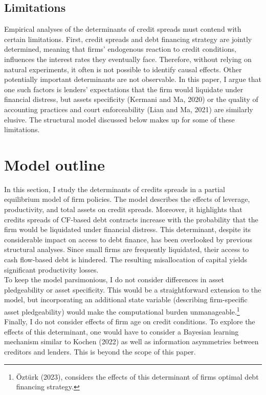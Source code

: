 \documentclass[12pt]{article}
\begin{document}
\subsection{Limitations}
Empirical analyses of the determinants of credit spreads must contend with certain limitations. First, credit spreads and debt financing strategy are jointly determined, meaning that firms' endogenous reaction to credit conditions, influences the interest rates they eventually face. Therefore, without relying on natural experiments, it often is not possible to identify causal effects. Other potentially important determinants are not observable. In this paper, I argue that one such factors is lenders' expectations that the firm would liquidate under financial distress, but assets specificity (Kermani and Ma, 2020) or the quality of accounting practices and court enforceability (Lian and Ma, 2021) are similarly elusive. The structural model discussed below makes up for some of these limitations. 

\section{Model outline} \label{sec:model}

In this section, I study the determinants of credits spreads in a partial equilibrium model of firm policies. The model describes the effects of leverage, productivity, and total assets on credit spreads. Moreover, it highlights that credits spreads of CF-based debt contracts increase with the probability that the firm would be liquidated under financial distress. This determinant, despite its considerable impact on access to debt finance, has been overlooked by previous structural analyses. Since small firms are frequently liquidated, their access to cash flow-based debt is hindered. The resulting misallocation of capital yields significant productivity losses. \vspace{3mm} \\
To keep the model parsimonious, I do not consider differences in asset pledgeability or asset specificity. This would be a straightforward extension to the model, but incorporating an additional state variable (describing firm-specific asset pledgeability) would make the computational burden unmanageable.\footnote{Öztürk (2023), considers the effects of this determinant of firms optimal debt financing strategy.} Finally, I do not consider effects of firm age on credit conditions. To explore the effects of this determinant, one would have to consider a Bayesian learning mechanism similar to Kochen (2022) as well as information asymmetries between creditors and lenders. This is beyond the scope of this paper. 
\end{document}
